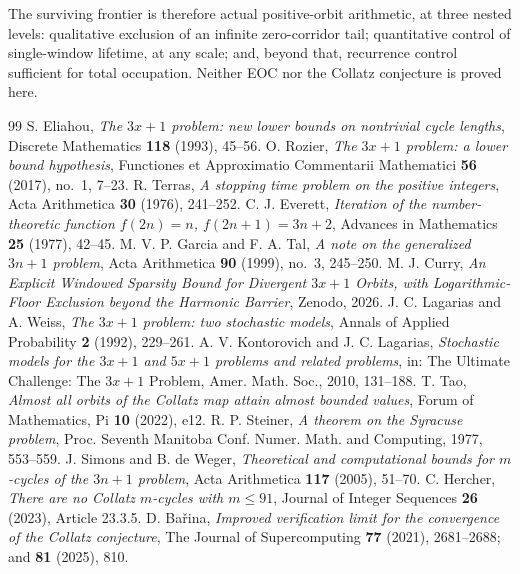\documentclass[11pt]{article}
\theoremstyle{plain}
\theoremstyle{definition}
\theoremstyle{remark}
\begin{document}
The surviving frontier is therefore actual positive-orbit arithmetic, at three nested levels:
qualitative exclusion of an infinite zero-corridor tail; quantitative control of single-window
lifetime, at any scale; and, beyond that, recurrence control sufficient for total occupation.
Neither EOC nor the Collatz conjecture is proved here.

\begin{thebibliography}{99}
 S. Eliahou, \emph{The $3x+1$ problem: new lower bounds on nontrivial cycle
lengths}, Discrete Mathematics \textbf{118} (1993), 45--56.
 O. Rozier, \emph{The $3x+1$ problem: a lower bound hypothesis}, Functiones et
Approximatio Commentarii Mathematici \textbf{56} (2017), no.~1, 7--23.
 R. Terras, \emph{A stopping time problem on the positive integers}, Acta
Arithmetica \textbf{30} (1976), 241--252.
 C. J. Everett, \emph{Iteration of the number-theoretic function $f(2n)=n$,
$f(2n+1)=3n+2$}, Advances in Mathematics \textbf{25} (1977), 42--45.
 M. V. P. Garcia and F. A. Tal, \emph{A note on the generalized $3n+1$ problem},
Acta Arithmetica \textbf{90} (1999), no.~3, 245--250.
 M. J. Curry, \emph{An Explicit Windowed Sparsity Bound for Divergent $3x+1$ Orbits,
with Logarithmic-Floor Exclusion beyond the Harmonic Barrier}, Zenodo, 2026.
 J. C. Lagarias and A. Weiss, \emph{The $3x+1$ problem: two stochastic
models}, Annals of Applied Probability \textbf{2} (1992), 229--261.
 A. V. Kontorovich and J. C. Lagarias, \emph{Stochastic models for the
$3x+1$ and $5x+1$ problems and related problems}, in: The Ultimate Challenge: The $3x+1$ Problem,
Amer. Math. Soc., 2010, 131--188.
 T. Tao, \emph{Almost all orbits of the Collatz map attain almost bounded values},
Forum of Mathematics, Pi \textbf{10} (2022), e12.
 R. P. Steiner, \emph{A theorem on the Syracuse problem}, Proc. Seventh Manitoba
Conf. Numer. Math. and Computing, 1977, 553--559.
 J. Simons and B. de Weger, \emph{Theoretical and computational bounds for
$m$-cycles of the $3n+1$ problem}, Acta Arithmetica \textbf{117} (2005), 51--70.
 C. Hercher, \emph{There are no Collatz $m$-cycles with $m\le91$}, Journal of
Integer Sequences \textbf{26} (2023), Article 23.3.5.
 D. Ba\v{r}ina, \emph{Improved verification limit for the convergence of the
Collatz conjecture}, The Journal of Supercomputing \textbf{77} (2021), 2681--2688; and
\textbf{81} (2025), 810.

\end{thebibliography}
\end{document}
